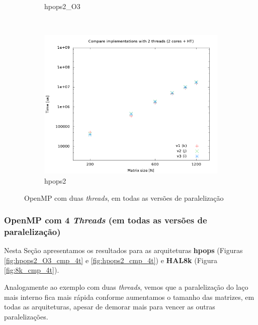 \documentclass[a4paper, 12pt]{article}
\begin{document}
\begin{figure}[H]
\begin{subfigure}[H]{0.5\textwidth}
        \caption{hpops2\_O3}
        \label{fig:hpops2_O3_cmp_2t}
    \end{subfigure}
    ~ %
    \begin{subfigure}[H]{0.5\textwidth}
        \includegraphics[width=\textwidth]{hpops2_cmp_versions-2t}
        \caption{hpops2}
        \label{fig:hpops2_cmp_2t}
    \end{subfigure}%
    \caption{OpenMP com duas \textit{threads}, em todas as versões de paralelização}\label{fig:animals}
\end{figure}

\subsubsection{OpenMP com 4 \textit{Threads} (em todas as versões de paralelização)}

Nesta Seção apresentamos os resultados para as arquiteturas \textbf{hpops}
(Figuras \ref{fig:hpops2_O3_cmp_4t} e \ref{fig:hpops2_cmp_4t}) e \textbf{HAL8k}
(Figura \ref{fig:8k_cmp_4t}).

Analogamente ao exemplo com duas \textit{threads}, vemos que a paralelização do
laço mais interno fica mais rápida conforme aumentamos o tamanho das matrizes,
em todas as arquiteturas, apesar de demorar mais para vencer as outras
paralelizações.
\end{document}
